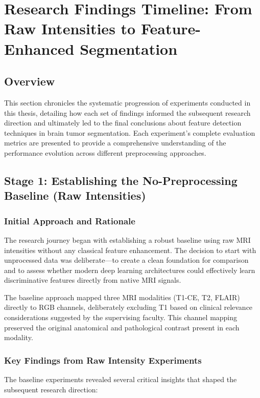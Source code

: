 \section{Research Findings Timeline: From Raw Intensities to Feature-Enhanced Segmentation}

\subsection{Overview}

This section chronicles the systematic progression of experiments conducted in this thesis, detailing how each set of findings informed the subsequent research direction and ultimately led to the final conclusions about feature detection techniques in brain tumor segmentation. Each experiment's complete evaluation metrics are presented to provide a comprehensive understanding of the performance evolution across different preprocessing approaches.

\subsection{Stage 1: Establishing the No-Preprocessing Baseline (Raw Intensities)}

\subsubsection{Initial Approach and Rationale}

The research journey began with establishing a robust baseline using raw MRI intensities without any classical feature enhancement. The decision to start with unprocessed data was deliberate—to create a clean foundation for comparison and to assess whether modern deep learning architectures could effectively learn discriminative features directly from native MRI signals.

The baseline approach mapped three MRI modalities (T1-CE, T2, FLAIR) directly to RGB channels, deliberately excluding T1 based on clinical relevance considerations suggested by the supervising faculty. This channel mapping preserved the original anatomical and pathological contrast present in each modality.

\subsubsection{Key Findings from Raw Intensity Experiments}

The baseline experiments revealed several critical insights that shaped the subsequent research direction:

